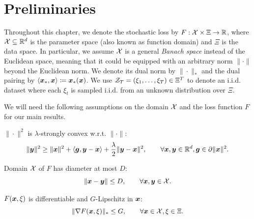 \section{Preliminaries}

Throughout this chapter, we denote the stochastic loss by $F: {\cal X}\times\Xi \to \mathbb R$, where ${\cal X}\subseteq \mathbb R^d$ is the parameter space (also known as function domain) and $\Xi$ is the data space. In particular, we assume ${\cal X}$ is a general \emph{Banach space} instead of the Euclidean space, meaning that it could be equipped with an arbitrary norm $\|\cdot\|$ beyond the Euclidean norm. We denote its dual norm by $\|\cdot\|_\ast$ and the dual pairing by $\langle {\boldsymbol{x}}_\ast, {\boldsymbol{x}}\rangle \coloneqq {\boldsymbol{x}}_*({\boldsymbol{x}})$. We use ${\cal Z}_T=(\xi_1,\ldots,\xi_T) \in \Xi^T$ to denote an i.i.d. dataset where each $\xi_t$ is sampled i.i.d. from an unknown distribution over $\Xi$.

We will need the following assumptions on the domain ${\cal X}$ and the loss function $F$ for our main results.

\begin{assumption}
\label{as:DP-OTB:sc-norm}
$\|\cdot\|^2$ is $\lambda$-strongly convex w.r.t. $\|\cdot\|$:
\begin{align}
    \|{\boldsymbol{y}}\|^2 \geq \|{\boldsymbol{x}}\|^2 + \langle {\boldsymbol{g}}, {\boldsymbol{y}}-{\boldsymbol{x}}\rangle + \frac{\lambda}{2}\|{\boldsymbol{y}}-{\boldsymbol{x}}\|^2,
    \qquad \forall {\boldsymbol{x}},{\boldsymbol{y}}\in\mathbb R^d, {\boldsymbol{g}} \in \partial \|{\boldsymbol{x}}\|^2.
    \label{eq:DP-OTB:sc-norm}
\end{align}
\end{assumption}

\begin{assumption}
\label{as:DP-OTB:bounded-domain}
Domain ${\cal X}$ of $F$ has diameter at most $D$:
\begin{equation}
    \|{\boldsymbol{x}} - {\boldsymbol{y}}\| \le D, 
    \qquad \forall {\boldsymbol{x}},{\boldsymbol{y}}\in{\cal X}.
    \label{eq:DP-OTB:bounded-domain}
\end{equation}
\end{assumption}

\begin{assumption}[Lipschitzness]
\label{as:DP-OTB:Lipschitz}
$F({\boldsymbol{x}},\xi)$ is differentiable and $G$-Lipschitz in ${\boldsymbol{x}}$:
\begin{equation}
    \|\nabla F({\boldsymbol{x}},\xi)\|_\ast \le G,
    \qquad \forall {\boldsymbol{x}}\in {\cal X}, \xi\in \Xi.
    \label{eq:DP-OTB:lipschitz}
\end{equation}
\end{assumption}

